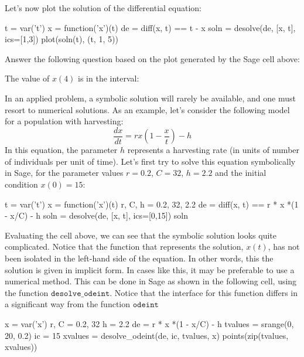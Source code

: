 \documentclass{ximera}
\begin{document}
Let's now plot the solution of the differential equation:

\begin{sageCell}
t = var('t')
x = function('x')(t)
de = diff(x, t) ==  t - x
soln = desolve(de, [x, t], ics=[1,3])
plot(soln(t), (t, 1, 5))
\end{sageCell}

\begin{problem} Answer the following question based on the plot generated by the Sage cell above:

The value of $x(4)$ is in the interval:
\wordChoice{\choice{$[1,1.5)$}, \choice{$[1.5,2)$}, \choice{$[2,2.5)$}, 
\choice{$[2.5,3)$}, \choice[correct]{$[3,3.5)$}, \choice{$[3.5,4)$}, \choice{$[4,4.5)$},
\choice{$[4.5,5)$}}

\end{problem}

In an applied problem, a symbolic solution will rarely be available, and one must resort to numerical solutions. As an example, let's consider the following model for a population with harvesting:
\[
\frac{dx}{dt}=rx\left(1-\frac{x}{t}\right)-h
\]
In this equation, the parameter $h$ represents a harvesting rate (in units of number of individuals per unit of time). Let's first try to solve this equation symbolically in Sage, for the parameter values $r=0.2$, $C=32$, $h=2.2$ and  the initial condition $x(0)=15$:

\begin{sageCell}
t = var('t')
x = function('x')(t)
r, C, h = 0.2, 32, 2.2
de = diff(x, t) == r * x *(1 - x/C) - h
soln = desolve(de, [x, t], ics=[0,15])
soln
\end{sageCell}

Evaluating the cell above, we can see that the symbolic solution looks quite complicated. Notice that the function that represents the solution, $x(t)$, has not been isolated in the left-hand side of the equation. In other words, this the solution is given in implicit form. In cases like this, it may be preferable to use a numerical method. This can be done in Sage as shown in the following cell, using the function $\mathtt{desolve\_odeint}$. Notice that the interface for this function differs in a significant way from the function $\mathtt{odeint}$

\begin{sageCell}
x = var('x')
r, C = 0.2, 32
h = 2.2
de = r * x *(1 - x/C) - h
tvalues = srange(0, 20, 0.2)
ic = 15
xvalues = desolve_odeint(de, ic, tvalues, x)
points(zip(tvalues, xvalues))
\end{sageCell}
\end{document}

